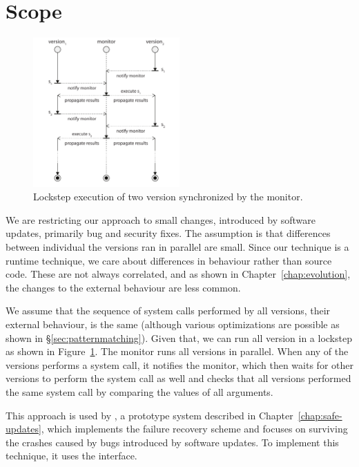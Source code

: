 \section{Scope}
\label{multi-version:scope}

\begin{figure}[t]
  \begin{center}
    \includegraphics[width=0.5\textwidth]{multi-version/figures/lockstep}
    \caption{Lockstep execution of two version synchronized by the monitor.}
    \label{fig:lockstep-execution}
  \end{center}
\end{figure}

We are restricting our approach to small changes, introduced by software
updates, primarily bug and security fixes. The assumption is that differences
between individual the versions ran in parallel are small. Since our technique
is a runtime technique, we care about differences in behaviour rather than
source code. These are not always correlated, and as shown in
Chapter~\ref{chap:evolution}, the changes to the external behaviour are less
common.

We assume that the sequence of system calls performed by all versions, \ie
their external behaviour, is the same (although various optimizations are
possible as shown in \S\ref{sec:patternmatching}). Given that, we can run all
version in a lockstep as shown in Figure~\ref{fig:lockstep-execution}.  The
monitor runs all versions in parallel. When any of the versions performs a
system call, it notifies the monitor, which then waits for other versions to
perform the system call as well and checks that all versions performed the same
system call by comparing the values of all arguments.

This approach is used by \mx, a prototype system described in
Chapter~\ref{chap:safe-updates}, which implements the failure recovery scheme
and focuses on surviving the crashes caused by bugs introduced by software
updates. To implement this technique, it uses the \ptrace interface.

